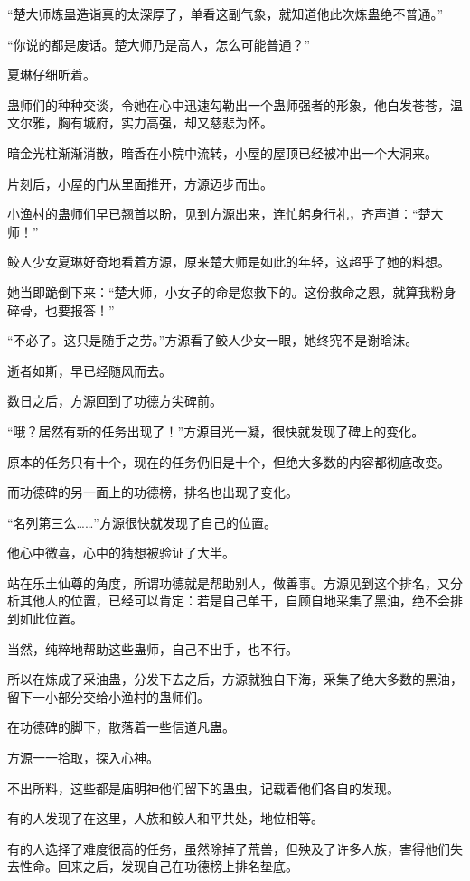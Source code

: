 \begin{this_body}
“楚大师炼蛊造诣真的太深厚了，单看这副气象，就知道他此次炼蛊绝不普通。”

“你说的都是废话。楚大师乃是高人，怎么可能普通？”

夏琳仔细听着。

蛊师们的种种交谈，令她在心中迅速勾勒出一个蛊师强者的形象，他白发苍苍，温文尔雅，胸有城府，实力高强，却又慈悲为怀。

暗金光柱渐渐消散，暗香在小院中流转，小屋的屋顶已经被冲出一个大洞来。

片刻后，小屋的门从里面推开，方源迈步而出。

小渔村的蛊师们早已翘首以盼，见到方源出来，连忙躬身行礼，齐声道：“楚大师！”

鲛人少女夏琳好奇地看着方源，原来楚大师是如此的年轻，这超乎了她的料想。

她当即跪倒下来：“楚大师，小女子的命是您救下的。这份救命之恩，就算我粉身碎骨，也要报答！”

“不必了。这只是随手之劳。”方源看了鲛人少女一眼，她终究不是谢晗沫。

逝者如斯，早已经随风而去。

数日之后，方源回到了功德方尖碑前。

“哦？居然有新的任务出现了！”方源目光一凝，很快就发现了碑上的变化。

原本的任务只有十个，现在的任务仍旧是十个，但绝大多数的内容都彻底改变。

而功德碑的另一面上的功德榜，排名也出现了变化。

“名列第三么……”方源很快就发现了自己的位置。

他心中微喜，心中的猜想被验证了大半。

站在乐土仙尊的角度，所谓功德就是帮助别人，做善事。方源见到这个排名，又分析其他人的位置，已经可以肯定：若是自己单干，自顾自地采集了黑油，绝不会排到如此位置。

当然，纯粹地帮助这些蛊师，自己不出手，也不行。

所以在炼成了采油蛊，分发下去之后，方源就独自下海，采集了绝大多数的黑油，留下一小部分交给小渔村的蛊师们。

在功德碑的脚下，散落着一些信道凡蛊。

方源一一拾取，探入心神。

不出所料，这些都是庙明神他们留下的蛊虫，记载着他们各自的发现。

有的人发现了在这里，人族和鲛人和平共处，地位相等。

有的人选择了难度很高的任务，虽然除掉了荒兽，但殃及了许多人族，害得他们失去性命。回来之后，发现自己在功德榜上排名垫底。


\end{this_body}
